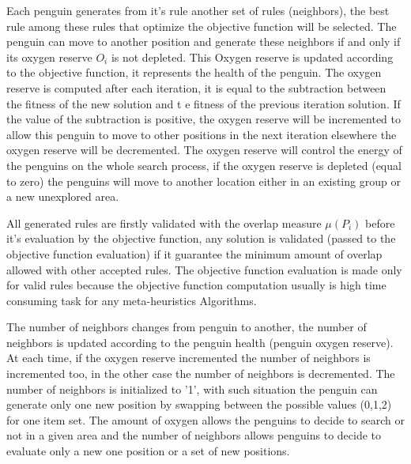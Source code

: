 \documentclass[preprint,12pt]{elsarticle}
\begin{document}
Each penguin generates from it's rule another set of rules (neighbors), the best rule among these rules that optimize the objective function will be selected. The penguin can move to another position and generate these neighbors  if and only if its oxygen reserve \textbf{$O_{i}$} is not depleted. This Oxygen reserve is updated according to the objective function, it represents the health of the penguin. The oxygen reserve is computed after each iteration, it is equal to the subtraction between the fitness of the new solution and t e fitness of the previous iteration solution. If the value of the subtraction is positive, the oxygen reserve will be incremented to allow this penguin to move to other positions in the next iteration elsewhere the oxygen reserve will be decremented. The oxygen reserve will control the energy of the penguins on the whole search process, if the oxygen reserve is depleted (equal to zero) the penguins will move to another location either in an existing group or a new unexplored area. 

All generated rules are firstly validated with the overlap measure $\mu(P_{i})$ before it's evaluation by the objective function, any solution is validated (passed to the objective function evaluation) if it guarantee the minimum amount of overlap allowed with other accepted rules. The objective function evaluation is made only for valid rules because the objective function computation usually is high time consuming task for any meta-heuristics Algorithms.

The number of neighbors changes from penguin to another, the number of neighbors is updated according to the penguin health (penguin oxygen reserve). At each time, if the oxygen reserve incremented the number of neighbors is incremented too, in the other case the number of neighbors is decremented. The number of neighbors is initialized to '1', with such situation the penguin can generate only one new position by swapping between the possible values (0,1,2) for one item set. The amount of oxygen allows the penguins to decide to search or not in a given area and the number of neighbors allows penguins to decide to evaluate only a new one position or a set of new positions. 
\end{document}

